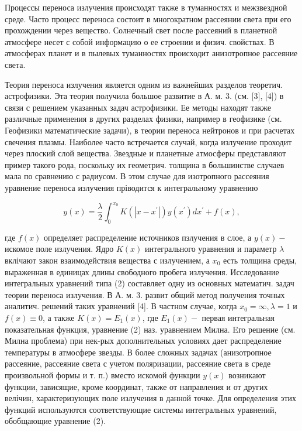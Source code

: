\documentclass[10pt]{article}
\begin{document}
Процессы переноса излучения происходят также в туманностях и межзвездной среде. Часто процесс переноса состоит в многократном рассеянии света при его прохождении через вещество. Солнечный свет после рассеяний в планетной атмосфере несет с собой информацию о ее строении и физич. свойствах. В атмосферах планет и в пылевых туманностях происходит анизотропное рассеяние света.



Теория переноса излучения является одним из важнейших разделов теоретич. астрофизики. Эта теория получила большое развитие в А. м. 3. (см. [3], [4]) в связи с решением указанных задач астрофизики. Ее методы находят также различные применения в других разделах физики, например в геофизике (см. Геофизики математические задачи), в теории переноса нейтронов и при расчетах свечения плазмы. Наиболее часто встречается случай, когда излучение проходит через плоский слой вещества. Звездные и планетные атмосферы представляют пример такого рода, поскольку их геометрич. толщина в большинстве случаев мала по сравнению с радиусом. В этом случае для изотропного рассеяния уравнение переноса излучения пріводится к интегральному уравнению



\[

y(x)=\frac{\lambda}{2} \int_{0}^{x_{0}} K\left(\left|x-x^{\prime}\right|\right) y\left(x^{\prime}\right) d x^{\prime}+f(x),

\]



где $f(x)$ определяет распределение источников пзлучения в слое, а $y(x)-$ искомое поле излучения. Ядро $K(x)$ интегрального уравнения и параметр $\lambda$ вклічают закон взаимодействия вещества с излучением, а $x_{0}$ есть толщина среды, выраженная в единицах длины свободного пробега излучения. Исследование интегральных уравнений типа (2) составляет одну из основных математич. задач теории переноса излучения. В А. м. 3. развит общий метод получения точных аналитич. решений таких уравнений [4]. В частном случае, когда $x_{0}=\infty, \lambda=1$ и $f(x) \equiv 0$, а также $K(x)=E_{1}(x)$, где $E_{1}(x)-$ первая интегральная показательная функция, уравнение (2) наз. уравнением Милна. Eго решение (см. Милна проблема) при нек-рых дополнительных условиях дает распределение температуры в атмосфере звезды. В более сложных задачах (анизотропное рассеяние, рассеяние света с учетом поляризации, рассеяние света в среде произвольной формы и т. п.) вместо искомой функции $y(x)$ возникают функции, зависящие, кроме координат, также от направления и от других велічин, характеризующих поле излучения в данной точке. Для определения этих функций используются соответствующие системы интегральных уравнений, обобщающие уравнение (2).
\end{document}
